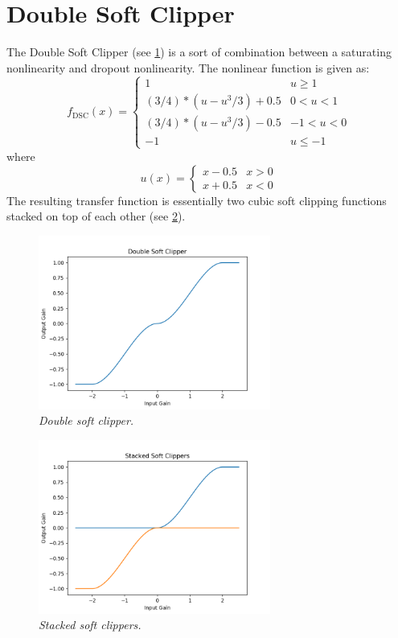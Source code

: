 \documentclass[twoside,a4paper]{article}
\begin{document}
\section{Double Soft Clipper} \label{sec:DSC}
%
The Double Soft Clipper (see \cref{DSC}) is a sort of
combination between a saturating nonlinearity and dropout
nonlinearity. The nonlinear function is given as:
%
\begin{equation}
    f_{\text{DSC}}(x) = \begin{cases}
        1 & u \geq 1 \\
        (3/4) * (u - u^3/3) + 0.5 & 0 < u < 1 \\
        (3/4) * (u - u^3/3) - 0.5 & -1 < u < 0 \\
        -1 & u \leq -1
    \end{cases}
    \label{eq:double-soft-clip}
\end{equation}
%
where
%
\begin{equation}
    u(x) = \begin{cases}
    x - 0.5 & x > 0 \\
    x + 0.5 & x < 0
    \end{cases}
    \label{eq:double-soft-clip_u}
\end{equation}
%
The resulting transfer function is essentially two cubic soft
clipping functions stacked on top of each other (see \cref{DSC-stack}).
%
\begin{figure}[h]
    \center
    \includegraphics[width=3in]{../DoubleSoftClipper/Pics/Double.png}
    \caption{\label{DSC}{\it Double soft clipper.}}
\end{figure}
%
\begin{figure}[h]
    \center
    \includegraphics[width=3in]{../DoubleSoftClipper/Pics/stacked.png}
    \caption{\label{DSC-stack}{\it Stacked soft clippers.}}
\end{figure}
\end{document}
